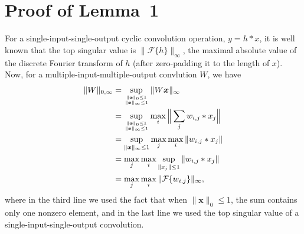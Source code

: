 \section{Proof of Lemma~1}
For a single-input-single-output cyclic convolution operation, $y=h*x$, it is well known that the top singular value is $\|\mathcal{F}\{h\}\|_\infty$, the maximal absolute value of the discrete Fourier transform of $h$ (after zero-padding it to the length of $x$). Now, for a multiple-input-multiple-output convlution $W$, we have
\begin{align}
\|W\|_{0,\infty} &= \sup_{\|\boldsymbol{x}\|_0 \leq 1\atop\|\boldsymbol{x}\|_\infty \leq 1} \|W\boldsymbol{x}\|_\infty \nonumber\\
&= \sup_{\|\boldsymbol{x}\|_0 \leq 1\atop\|\boldsymbol{x}\|_\infty \leq 1} \max_{i}\Big\|\sum_j w_{i,j}*x_j\Big\| \nonumber\\
& =  \sup_{\|\boldsymbol{x}\|_\infty \leq 1} \max_j \max_{i}\| w_{i,j}*x_j\| \nonumber\\
& =  \max_j \max_{i} \sup_{\|x_j\| \leq 1}\| w_{i,j}*x_j\| \nonumber\\
& =  \max_j \max_{i} \|\mathcal{F}\{w_{i,j}\}\|_\infty,
\end{align}
where in the third line we used the fact that when $\|\boldsymbol{x}\|_0 \leq 1$, the sum contains only one nonzero element, and in the last line we used the top singular value of a single-input-single-output convolution.

